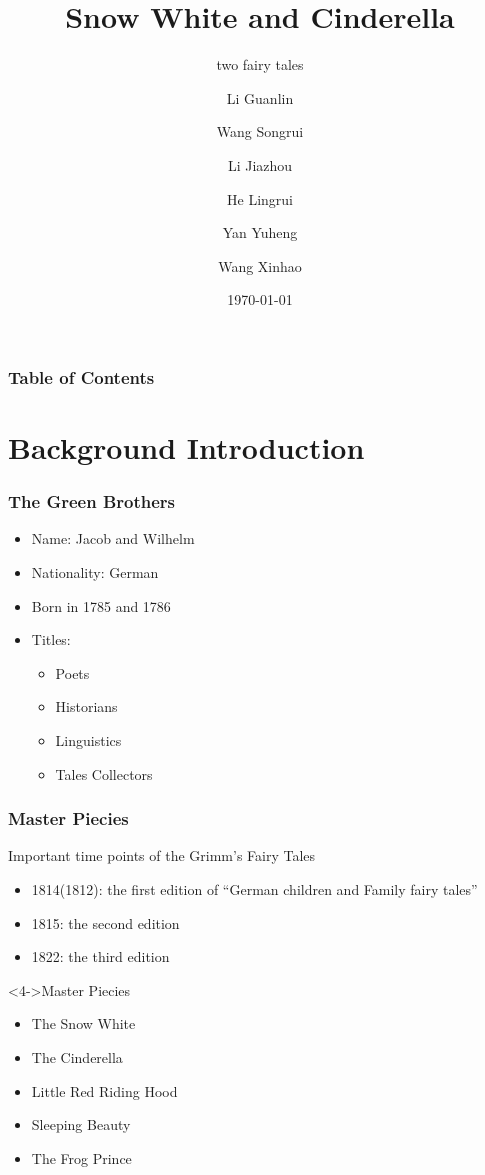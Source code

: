 \documentclass{beamer}
\title[Reflection on Snow White and Cinderella]
{Snow White and Cinderella}
\subtitle{two fairy tales}
\author[Eric, Richard] %
{Li Guanlin\inst{1} \and Wang Songrui\inst{1} \and Li Jiazhou\inst{1} \and He Lingrui\inst{1} \and Yan Yuheng\inst{1} \and Wang Xinhao\inst{1}}
\institute[NJU] %
{
    \inst{1}%
    Undeegraduate in ICS\\
    Nanjing University
}
\date[NJU 2023] %
{\today}
\begin{document}
\frame{\titlepage}

\begin{frame}
    \frametitle{Table of Contents}
    \tableofcontents
\end{frame}

\section{Background Introduction}
\begin{frame}
    \frametitle{The Green Brothers}
    \begin{itemize}
        \item<1-> Name: Jacob and Wilhelm
        \item<2-> Nationality: German
        \item<3-> Born in 1785 and 1786
        \item<4-> Titles:
            \begin{itemize}
                \item Poets
                \item Historians
                \item Linguistics
                \item \alert{Tales Collectors}
            \end{itemize}
    \end{itemize}
    \frametitle{Master Piecies}
    \begin{block}{Important time points of the Grimm's Fairy Tales}
        \begin{itemize}
            \item<1-> 1814(1812): the first edition of ``German children and Family fairy tales''
            \item<2-> 1815: the second edition
            \item<3-> 1822: the third edition %
        \end{itemize}
    \end{block}
    \begin{block}<4->{Master Piecies}
        \begin{itemize}
            \item<5-> \alert{The Snow White}
            \item<5-> \alert{The Cinderella}
            \item<4-> Little Red Riding Hood
            \item<4-> Sleeping Beauty
            \item<4-> The Frog Prince
        \end{itemize}
    \end{block}
\end{frame}
\end{document}
